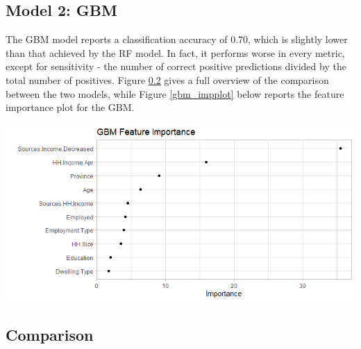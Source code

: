 \documentclass[11pt,preprint, authoryear]{elsarticle}
\let\origfigure\figure
\let\endorigfigure\endfigure
\renewenvironment{figure}[1][2] {
    \expandafter\origfigure\expandafter[H]
} {
    \endorigfigure
}
\numberwithin{equation}{section}
\numberwithin{figure}{section}
\numberwithin{table}{section}
\begin{document}
\hypertarget{model-2-gbm}{%
\subsection{Model 2: GBM}\label{model-2-gbm}}

The GBM model reports a classification accuracy of 0.70, which is
slightly lower than that achieved by the RF model. In fact, it performs
worse in every metric, except for sensitivity - the number of correct
positive predictions divided by the total number of positives. Figure
\ref{comparison} gives a full overview of the comparison between the two
models, while Figure \ref{gbm_impplot} below reports the feature
importance plot for the GBM.

\begin{figure}[H]
\includegraphics[width=1\linewidth]{Figures/gbm_impplot} \caption{\label{gbm_impplot} GBM Feature Importance}\label{fig:gbm_impplot}
\end{figure}

\hypertarget{comparison}{%
\subsection{Comparison}\label{comparison}}
\end{document}

